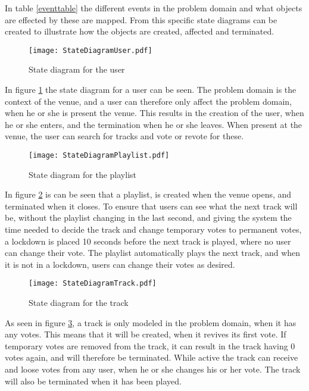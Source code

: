 In table \cref{eventtable} the different events in the problem domain and what objects are effected by these are mapped. From this specific state diagrams can be created to illustrate how the objects are created, affected and terminated.

\begin{figure}[H]
  \centering
  \texttt{[image: StateDiagramUser.pdf]}
  \caption{State diagram for the user}\label{fig:StateDiagramUser}
\end{figure}
In figure \cref{fig:StateDiagramUser} the state diagram for a user can be seen. The problem domain is the context of the venue, and a user can therefore only affect the problem domain, when he or she is present the venue. This results in the creation of the user, when he or she enters, and the termination when he or she leaves. When present at the venue, the user can search for tracks and vote or revote for these.

\begin{figure}[H]
  \centering
  \texttt{[image: StateDiagramPlaylist.pdf]}
  \caption{State diagram for the playlist}\label{fig:StateDiagramPlaylist}
\end{figure}
In figure \cref{fig:StateDiagramPlaylist} is can be seen that a playlist, is created when the venue opens, and terminated when it closes. To ensure that users can see what the next track will be, without the playlist changing in the last second, and giving the system the time needed to decide the track and change temporary votes to permanent votes, a lockdown is placed 10 seconds before the next track is played, where no user can change their vote. The playlist automatically plays the next track, and when it is not in a lockdown, users can change their votes as desired.

\begin{figure}[H]
  \centering
  \texttt{[image: StateDiagramTrack.pdf]}
  \caption{State diagram for the track}\label{fig:StateDiagramTrack}
\end{figure}
As seen in figure \cref{fig:StateDiagramTrack}, a track is only modeled in the problem domain, when it has any votes. This means that it will be created, when it revives its first vote. If temporary votes are removed from the track, it can result in the track having 0 votes again, and will therefore be terminated. While active the track can receive and loose votes from any user, when he or she changes his or her vote. The track will also be terminated when it has been played.

